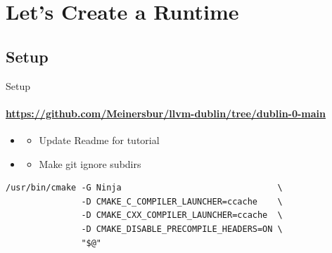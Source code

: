 \section{Let's Create a Runtime}


\subsection{Setup}
\begin{frame}[fragile]{Setup}
\framesubtitle{\url{https://github.com/Meinersbur/llvm-dublin/tree/dublin-0-main}}
\begin{itemize}
\item[\pgfuseimage{file}] 
  \begin{itemize}
  \item Update Readme for tutorial
  \end{itemize}
\item[\pgfuseimage{file}] 
  \begin{itemize}
  \item Make git ignore  subdirs 
  \end{itemize}
\end{itemize}

\medskip

\begin{block}{}
\begin{verbatim}
/usr/bin/cmake -G Ninja                               \
               -D CMAKE_C_COMPILER_LAUNCHER=ccache    \
               -D CMAKE_CXX_COMPILER_LAUNCHER=ccache  \
               -D CMAKE_DISABLE_PRECOMPILE_HEADERS=ON \
               "$@"
\end{verbatim}
\end{block}
\end{frame}



